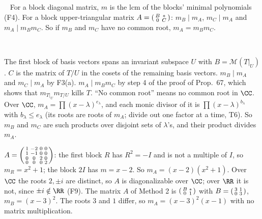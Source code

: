 \documentclass[10pt]{scrartcl}
\newcommand{\MM}{\mathcal M}
\newcommand{\why}[1]{\par\vspace{2pt}{\color{OliveGreen!70!black}\textbf{Why.}}\ #1\par}
\newenvironment{steps}{\begin{enumerate}[label=\arabic*.,leftmargin=1.5em,itemsep=2pt,topsep=2pt]}{\end{enumerate}}
\newcommand{\method}[1]{\par\needspace{5\baselineskip}\medskip\noindent{\color{NavyBlue}\textbf{#1}}\ }
\begin{document}
\method{Method 3: blocks.} For a block diagonal matrix, $m$ is the lcm of the blocks' minimal polynomials (F4). For a block upper-triangular matrix $A=\begin{psmallmatrix}B&*\\0&C\end{psmallmatrix}$: $m_B\mid m_A$, $m_C\mid m_A$ and $m_A\mid m_Bm_C$. So if $m_B$ and $m_C$ have no common root, $m_A=m_Bm_C$.
\why{\begin{steps}
  \ii The first block of basis vectors spans an invariant subspace $U$ with $B=\MM(T|_U)$. $C$ is the matrix of $T/U$ in the cosets of the remaining basis vectors.
  \ii $m_B\mid m_A$ and $m_C\mid m_A$ by F3(a). $m_A\mid m_Bm_C$ by step 4 of the proof of Prop.~67, which shows that $m_{T|_U}m_{T/U}$ kills $T$.
  \ii ``No common root'' means no common root in $\CC$. Over $\CC$, $m_A=\prod(x-\lambda)^{e_\lambda}$, and each monic divisor of it is $\prod(x-\lambda)^{b_\lambda}$ with $b_\lambda\le e_\lambda$ (its roots are roots of $m_A$; divide out one factor at a time, T6).
  \ii So $m_B$ and $m_C$ are such products over disjoint sets of $\lambda$'s, and their product divides $m_A$.
\end{steps}}
\begin{itemize}
  \ii $A=\begin{psmallmatrix}1&-2&0&0\\1&-1&0&0\\0&0&2&0\\0&0&0&2\end{psmallmatrix}$: the first block $R$ has $R^2=-I$ and is not a multiple of $I$, so $m_R=x^2+1$; the block $2I$ has $m=x-2$. So $m_A=(x-2)(x^2+1)$. Over $\CC$ the roots $2,\pm i$ are distinct, so $A$ is diagonalizable over $\CC$; over $\RR$ it is not, since $\pm i\notin\RR$ (F9).
  \ii The matrix $A$ of Method 2 is $\begin{psmallmatrix}B&*\\0&1\end{psmallmatrix}$ with $B=\begin{psmallmatrix}3&1\\0&3\end{psmallmatrix}$, $m_B=(x-3)^2$. The roots $3$ and $1$ differ, so $m_A=(x-3)^2(x-1)$ with no matrix multiplication.
\end{itemize}
\end{document}
